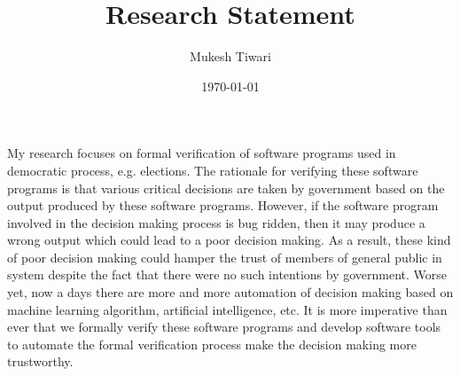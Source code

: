 \documentclass[a4paper]{article}
\title{Research Statement}
\author{Mukesh Tiwari}
\date{\today}
\begin{document}
\fontsize{12}{15}
\selectfont
\maketitle



My research focuses on formal verification of software programs used in  democratic process, e.g. elections.  
The rationale for verifying these software programs is that various 
critical decisions are taken by government based on the output produced by these software programs. However, if the 
software program involved in the decision making process is bug ridden, then it may produce a wrong 
output which could lead to a poor decision making. As a result, these kind of poor 
decision making could hamper the trust of  members of 
general public in system despite the fact that there were no such intentions by government. 
Worse yet, now a days there are more and more automation of decision making based on machine learning algorithm, 
artificial intelligence, etc.  It is more imperative than ever  that  we formally verify these software programs and 
develop software tools to automate the formal verification process make the decision making more trustworthy. 
\end{document}
